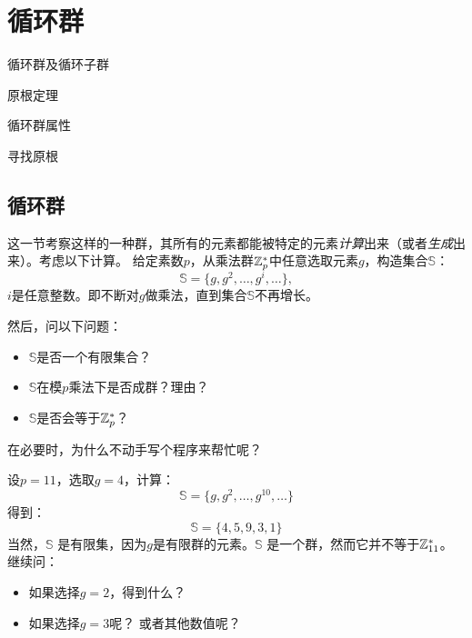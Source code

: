 
%

\chapter{循环群}
\label{chap:cyc_grp} %

\begin{introduction}
  \item 循环群及循环子群
  \item 原根定理
  \item 循环群属性
  \item 寻找原根
\end{introduction}

\section{循环群}
\label{sec:cyc_gr}
这一节考察这样的一种群，其所有的元素都能被特定的元素\emph{计算}出来（或者\emph{生成}出来）。考虑以下计算。
给定素数$p$，从乘法群${\mathbb Z}_p^*$中任意选取元素$g$，构造集合$\mathbb{S}$：
		\[\mathbb{S} = \{ g, g^2,  \ldots, g^{i}, \ldots \} ,\]
		$i$是任意整数。即不断对$g$做乘法，直到集合$\mathbb{S}$不再增长。
		
然后，问以下问题：
		\begin{itemize}
			\item $\mathbb{S}$是否一个有限集合？
			
			\item $\mathbb{S}$在模$p$乘法下是否成群？理由？
						
				\item $\mathbb{S}$是否会等于${\mathbb Z}_p^*$？			
		\end{itemize}
在必要时，为什么不动手写个程序来帮忙呢？
\begin{example}
  \label{exm:cyc_z11}
		设$p = 11$，选取$g = 4$，计算：
			\[\mathbb{S} = \{ g, g^2, \ldots, g^{10}, \ldots \} \]
	    得到：
		\[\mathbb{S} = \{ 4, 5, 9, 3, 1 \} \]
		当然，$\mathbb{S}$ 是有限集，因为$g$是有限群的元素。$\mathbb{S}$ 是一个群，然而它并不等于${\mathbb Z}_{11}^*$。
		继续问：
		\begin{itemize}
			\item 如果选择$g = 2$，得到什么？
			
			\item 如果选择$g = 3$呢？ 或者其他数值呢？			
		\end{itemize}
\end{example}

